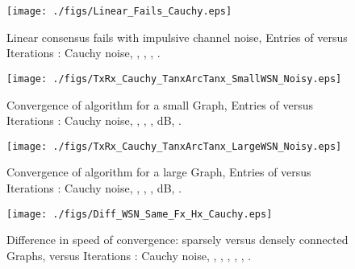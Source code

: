 \documentclass[onecolumn, draft, 12pt]{IEEEtran}
\begin{document}




\newpage

\begin{figure}[tb]
\begin{minipage}{1\textwidth}
\centering
\begin{center}
\texttt{[image: ./figs/Linear\_Fails\_Cauchy.eps]} \caption{Linear consensus fails with impulsive channel noise, Entries of  versus Iterations : Cauchy noise, , , , .}\label{fig:Linear_Fails_Cauchy}
\end{center}
\end{minipage}
\end{figure}

\begin{figure}[tb]
\begin{minipage}{1\textwidth}
\centering
\begin{center}
\texttt{[image: ./figs/TxRx\_Cauchy\_TanxArcTanx\_SmallWSN\_Noisy.eps]} \caption{Convergence of  algorithm for a small Graph, Entries of  versus Iterations : Cauchy noise, , , ,  dB, .}\label{fig:TxRx_Cauchy_TanxArcTanx_SmallWSN_Noisy}
\end{center}
\end{minipage}
\end{figure}

\begin{figure}[tb]
\begin{minipage}{1\textwidth}
\centering
\begin{center}
\texttt{[image: ./figs/TxRx\_Cauchy\_TanxArcTanx\_LargeWSN\_Noisy.eps]} \caption{Convergence of  algorithm for a large Graph, Entries of  versus Iterations : Cauchy noise, , , ,  dB, .}\label{fig:TxRx_Cauchy_TanxArcTanx_LargeWSN_Noisy}
\end{center}
\end{minipage}
\end{figure}

\begin{figure}[tb]
\begin{minipage}{1\textwidth}
\centering
\begin{center}
\texttt{[image: ./figs/Diff\_WSN\_Same\_Fx\_Hx\_Cauchy.eps]} \caption{Difference in speed of convergence: sparsely versus densely connected Graphs,  versus Iterations : Cauchy noise, , , , , , .}\label{fig:Diff_WSN_Same_Fx_Hx_Cauchy}
\end{center}
\end{minipage}
\end{figure}
\end{document}
